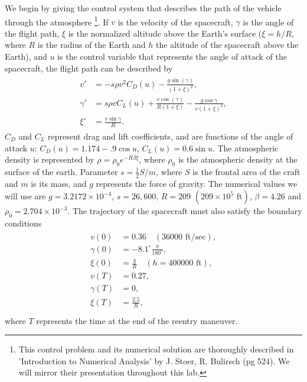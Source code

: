 \label{lab:reentry}


We begin by giving the control system that describes the path of the vehicle through the atmosphere
\footnote{This control problem and its numerical solution are thoroughly described in 'Introduction to Numerical Analysis' by J. Stoer, R. Bulirsch (pg 524). 
We will mirror their presentation throughout this lab.}. 
If $v$ is the velocity of the spacecraft, $\gamma$ is the angle of the flight path, $\xi$ is the normalized altitude above the Earth's surface ($\xi = h/R$, where $R$ is the radius of the Earth and $h$ the altitude of the spacecraft above the Earth), and $u$ is the control variable that represents the angle of attack of the spacecraft, the flight path can be described by 
\begin{align}
\begin{split}
v' &= -s\rho v^2C_D(u) - \frac{g\sin(\gamma)}{(1+\xi)^2},\\
\gamma ' &= s \rho v C_L(u) + \frac{v \cos(\gamma)}{R(1+\xi)} - \frac{g \cos \gamma}{v(1+\xi)^2},\\
\xi' &= \frac{v \sin \gamma}{R}.
\end{split} \label{eqn:reentry:control_system}
\end{align}
$C_D$ and $C_L$ represent drag and lift coefficients, and are functions of the angle of attack $u$: $C_D(u) = 1.174 - .9\cos u$, $C_L(u) = 0.6\sin u$. 
The atmospheric density is represented by $\rho = \rho_0e^{-R\beta\xi}$, where  $\rho_0$ is the atmospheric density at the surface of the earth. 
Parameter $s = \frac{1}{2}S/m$, where $S$ is the frontal area of the craft and $m$ is its mass, and $g$ represents the force of gravity. 
The numerical values we will use are $g = 3.2172\times10^{-4}$, $s = 26,600$, $R = 209$ $(209\times 10^5 \text{ ft})$, $\beta = 4.26$ and $\rho_0 = 2.704\times 10^{-3}$.
The trajectory of the spacecraft must also satisfy the boundary conditions
\begin{align}
\begin{split}
	v(0) &= 0.36 \quad (36000 \text{ ft/sec}),\\
	\gamma(0) &= -8.1^\circ \frac{\pi}{180^\circ}, \\
	\xi(0)&= \frac{4}{R}\quad (h = 400000 \text{ ft}), \\
	v(T) &= 0.27,\\
	\gamma(T) &= 0, \\
	\xi(T)&= \frac{2.5}{R}, \\
\end{split}
\end{align}
where $T$ represents the time at the end of the reentry maneuver. 


